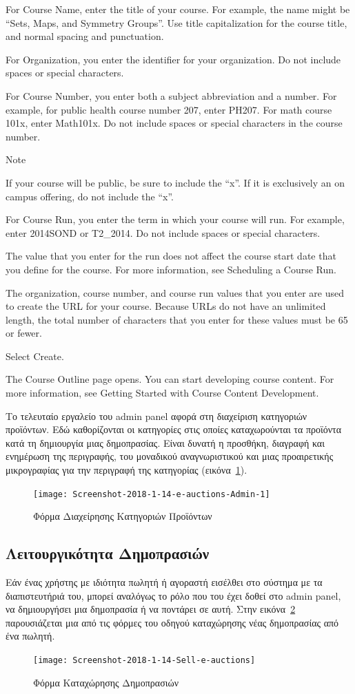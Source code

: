 \documentclass[12pt]{report}
\begin{document}
        For Course Name, enter the title of your course. For example, the name might be “Sets, Maps, and Symmetry Groups”. Use title capitalization for the course title, and normal spacing and punctuation.

        For Organization, you enter the identifier for your organization. Do not include spaces or special characters.

        For Course Number, you enter both a subject abbreviation and a number. For example, for public health course number 207, enter PH207. For math course 101x, enter Math101x. Do not include spaces or special characters in the course number.

        Note

        If your course will be public, be sure to include the “x”. If it is exclusively an on campus offering, do not include the “x”.

        For Course Run, you enter the term in which your course will run. For example, enter 2014SOND or T2_2014. Do not include spaces or special characters.

        The value that you enter for the run does not affect the course start date that you define for the course. For more information, see Scheduling a Course Run.

    The organization, course number, and course run values that you enter are used to create the URL for your course. Because URLs do not have an unlimited length, the total number of characters that you enter for these values must be 65 or fewer.

    Select Create.

    The Course Outline page opens. You can start developing course content. For more information, see Getting Started with Course Content Development.

Το τελευταίο εργαλείο του \textlatin{admin panel} αφορά στη διαχείριση κατηγοριών προϊόντων. Εδώ καθορίζονται οι κατηγορίες στις οποίες καταχωρούνται τα προϊόντα κατά τη δημιουργία μιας δημοπρασίας. Είναι δυνατή η προσθήκη, διαγραφή και ενημέρωση της περιγραφής, του μοναδικού αναγνωριστικού και μιας προαιρετικής μικρογραφίας για την περιγραφή της κατηγορίας (εικόνα~\ref{fig:category_admin}).
\begin{figure}[H]
\centering
\texttt{[image: Screenshot-2018-1-14-e-auctions-Admin-1]}
\caption{Φόρμα Διαχείρησης Κατηγοριών Προϊόντων}
\label{fig:category_admin}
\end{figure}

\subsection{Λειτουργικότητα Δημοπρασιών}
Εάν ένας χρήστης με ιδιότητα πωλητή ή αγοραστή εισέλθει στο σύστημα με τα διαπιστευτήριά του, μπορεί αναλόγως το ρόλο που του έχει δοθεί στο \textlatin{admin panel}, να δημιουργήσει μια δημοπρασία ή να ποντάρει σε αυτή. Στην εικόνα~\ref{fig:auction_new} παρουσιάζεται μια από τις φόρμες του οδηγού καταχώρησης νέας δημοπρασίας από ένα πωλητή.
\begin{figure}[H]
\centering
\texttt{[image: Screenshot-2018-1-14-Sell-e-auctions]}
\caption{Φόρμα Καταχώρησης Δημοπρασιών}
\label{fig:auction_new}
\end{figure}
\end{document}
